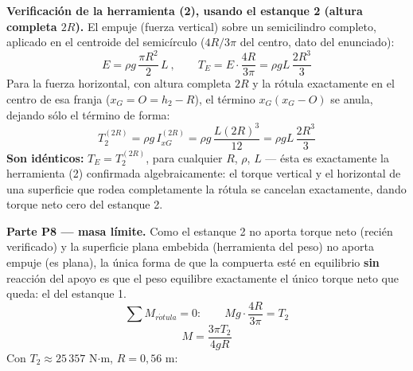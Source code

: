 \documentclass[11pt]{article}
\begin{document}
\textbf{Verificaci\'on de la herramienta (2), usando el estanque 2 (altura completa
$2R$).} El empuje (fuerza vertical) sobre un semicilindro completo, aplicado en el
centroide del semic\'irculo ($4R/3\pi$ del centro, dato del enunciado):
\begin{equation}
E=\rho g\,\frac{\pi R^2}{2}\,L
\ ,\qquad
T_E=E\cdot\frac{4R}{3\pi}=\rho g L\,\frac{2R^3}{3}
\end{equation}
Para la fuerza horizontal, con altura completa $2R$ y la r\'otula exactamente en el
centro de esa franja ($x_G=O=h_2-R$), el t\'ermino $x_G(x_G-O)$ se anula, dejando s\'olo
el t\'ermino de forma:
\begin{equation}
T_2^{(2R)}=\rho g\,I_{xG}^{(2R)}=\rho g\,\frac{L(2R)^3}{12}=\rho g L\,\frac{2R^3}{3}
\end{equation}
\textbf{Son id\'enticos:} $T_E=T_2^{(2R)}$, para cualquier $R$, $\rho$, $L$ --- \'esta
es exactamente la herramienta (2) confirmada algebraicamente: el torque vertical y el
horizontal de una superficie que rodea completamente la r\'otula se cancelan
exactamente, dando torque neto cero del estanque 2.

\textbf{Parte P8 --- masa l\'imite.} Como el estanque 2 no aporta torque neto (recién
verificado) y la superficie plana embebida (herramienta del peso) no aporta empuje
(es plana), la \'unica forma de que la compuerta est\'e en equilibrio \textbf{sin}
reacci\'on del apoyo es que el peso equilibre exactamente el \'unico torque neto que
queda: el del estanque 1.
\begin{equation}
\sum M_{r\acute otula}=0:\qquad Mg\cdot\frac{4R}{3\pi}=T_2
\end{equation}
\begin{equation}
\boxed{M=\frac{3\pi T_2}{4gR}}
\end{equation}
Con $T_2\approx25\,357$ N$\cdot$m, $R=0{,}56$ m:
\begin{center}
\end{center}

\vspace{4pt}
\end{document}
